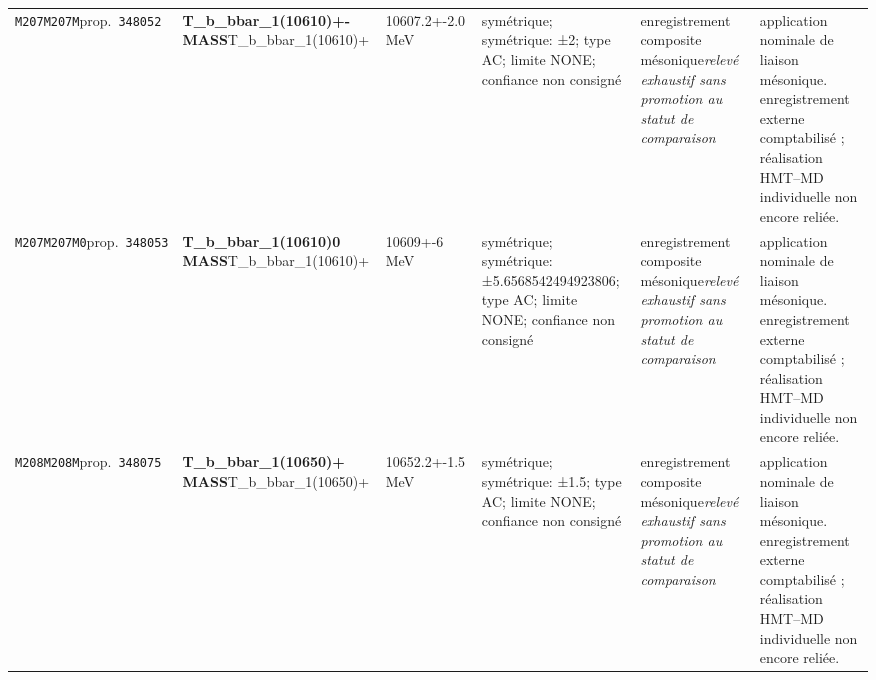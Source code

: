 \begin{landscape}
\begin{longtable}{L{1.85cm}L{4.45cm}L{2.35cm}L{4.05cm}L{3.35cm}L{7.15cm}}
\texttt{M207}\newline \texttt{M207M}\newline prop.\ \texttt{348052} & \textbf{T\_\allowbreak{}b\_\allowbreak{}bbar\_\allowbreak{}1(10610)+- MASS}\newline T\_\allowbreak{}b\_\allowbreak{}bbar\_\allowbreak{}1(10610)+ & 10607.2+-2.0\,MeV & symétrique; symétrique: ±2; type AC; limite NONE; confiance non consigné & enregistrement composite mésonique\newline \emph{relevé exhaustif sans promotion au statut de comparaison} & application nominale de liaison mésonique. enregistrement externe comptabilisé ; réalisation HMT--MD individuelle non encore reliée. \\
\texttt{M207}\newline \texttt{M207M0}\newline prop.\ \texttt{348053} & \textbf{T\_\allowbreak{}b\_\allowbreak{}bbar\_\allowbreak{}1(10610)0 MASS}\newline T\_\allowbreak{}b\_\allowbreak{}bbar\_\allowbreak{}1(10610)+ & 10609+-6\,MeV & symétrique; symétrique: ±5.6568542494923806; type AC; limite NONE; confiance non consigné & enregistrement composite mésonique\newline \emph{relevé exhaustif sans promotion au statut de comparaison} & application nominale de liaison mésonique. enregistrement externe comptabilisé ; réalisation HMT--MD individuelle non encore reliée. \\
\texttt{M208}\newline \texttt{M208M}\newline prop.\ \texttt{348075} & \textbf{T\_\allowbreak{}b\_\allowbreak{}bbar\_\allowbreak{}1(10650)+ MASS}\newline T\_\allowbreak{}b\_\allowbreak{}bbar\_\allowbreak{}1(10650)+ & 10652.2+-1.5\,MeV & symétrique; symétrique: ±1.5; type AC; limite NONE; confiance non consigné & enregistrement composite mésonique\newline \emph{relevé exhaustif sans promotion au statut de comparaison} & application nominale de liaison mésonique. enregistrement externe comptabilisé ; réalisation HMT--MD individuelle non encore reliée. \\

\end{longtable}
\end{landscape}
